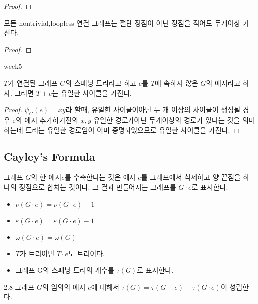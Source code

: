 \begin{proof}
    
\end{proof}

\begin{corollary}
    모든 nontrivial,loopless 연결 그래프는 절단 정점이 아닌 정점을 적어도 두개이상 가진다.
\end{corollary}


\begin{proof}
    
\end{proof}

week5



\begin{theorem}
    $T$가 연결된 그래프 $G$의 스패닝 트리라고 하고 $e$를 $T$에 속하지 않은 $G$의 에지라고 하자. 그러면 $T + e$는 유일한 사이클을 가진다.
\end{theorem}
\begin{proof}
    $\psi_G(e) = xy$라 할때, 유일한 사이클이아닌 두 개 이상의 사이클이 생성될 경우  e의 에지 추가하기전의 $x, y$ 유일한 경로가아닌 두개이상의 경로가 있다는 것을 의미하는데 트리는 유일한 경로임이 이미 증명되었으므로 유일한 사이클을 가진다.
\end{proof}







\subsection{Cayley's Formula}
\begin{dfn}[contract]
    그래프 $G$의 한 에지$e$를 수축한다는 것은 에지 $e$를 그래프에서 삭제하고 양 끝점을 하나의 정점으로 합치는 것이다. 그 결과 만들어지는 그래프를 $G \cdot e$로 표시한다.
    \begin{itemize}
        \item $\nu(G \cdot e) = \nu(G \cdot e) - 1$
        \item $\varepsilon(G \cdot e) = \varepsilon(G \cdot e)-1$
        \item $\omega(G \cdot e) = \omega(G)$
        \item  $T$가 트리이면 $T \cdot e$도 트리이다.
        \item 그래프 G의 스패닝 트리의 개수를 $\tau(G)$로 표시한다.
    \end{itemize}
\end{dfn}

\begin{theorem}
    2.8 그래프 $G$의 임의의 에지 $e$에 대해서 $\tau(G) =\tau(G-e) + \tau(G \cdot e)$이 성립한다.
\end{theorem}

